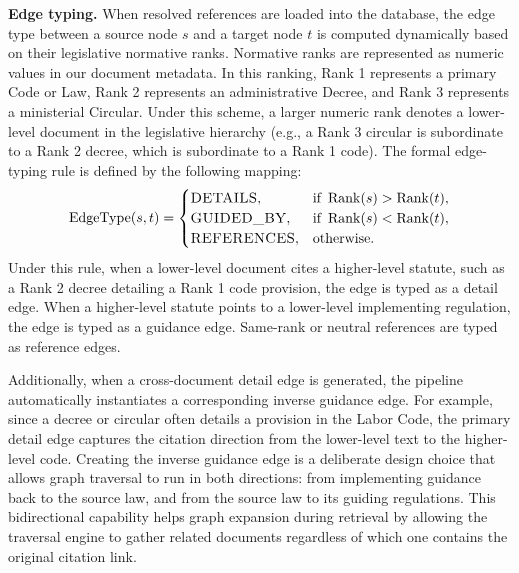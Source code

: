 \textbf{Edge typing.} When resolved references are loaded into the database, the edge type between a source node $s$ and a target node $t$ is computed dynamically based on their legislative normative ranks. Normative ranks are represented as numeric values in our document metadata. In this ranking, Rank 1 represents a primary Code or Law, Rank 2 represents an administrative Decree, and Rank 3 represents a ministerial Circular. Under this scheme, a larger numeric rank denotes a lower-level document in the legislative hierarchy (e.g., a Rank 3 circular is subordinate to a Rank 2 decree, which is subordinate to a Rank 1 code). The formal edge-typing rule is defined by the following mapping:
\[
\operatorname{EdgeType}(s,t)=
\begin{cases}
\text{\textsc{DETAILS}}, & \text{if } \operatorname{Rank}(s) > \operatorname{Rank}(t),\\
\text{\textsc{GUIDED\_BY}}, & \text{if } \operatorname{Rank}(s) < \operatorname{Rank}(t),\\
\text{\textsc{REFERENCES}}, & \text{otherwise.}
\end{cases}
\]
Under this rule, when a lower-level document cites a higher-level statute, such as a Rank 2 decree detailing a Rank 1 code provision, the edge is typed as a detail edge. When a higher-level statute points to a lower-level implementing regulation, the edge is typed as a guidance edge. Same-rank or neutral references are typed as reference edges.

Additionally, when a cross-document detail edge is generated, the pipeline automatically instantiates a corresponding inverse guidance edge. For example, since a decree or circular often details a provision in the Labor Code, the primary detail edge captures the citation direction from the lower-level text to the higher-level code. Creating the inverse guidance edge is a deliberate design choice that allows graph traversal to run in both directions: from implementing guidance back to the source law, and from the source law to its guiding regulations. This bidirectional capability helps graph expansion during retrieval by allowing the traversal engine to gather related documents regardless of which one contains the original citation link.

